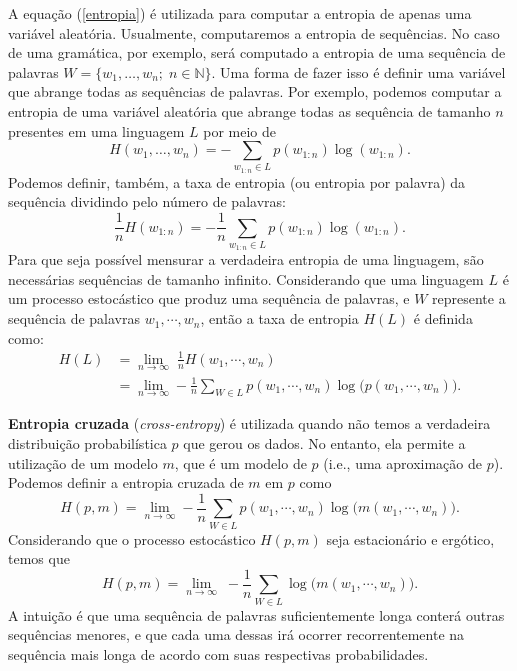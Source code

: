 \documentclass{automatextcc}
\newcommand{\N}{\mathds{N}}
\begin{document}
A equação (\ref{entropia}) é utilizada para computar a entropia de apenas uma variável aleatória. Usualmente, computaremos a entropia de sequências. No caso de uma gramática, por exemplo, será computado a entropia de uma sequência de palavras $W = \{w_1,\dots,w_n; \; n \in \N \}$. Uma forma de fazer isso é definir uma variável que abrange todas as sequências de palavras. Por exemplo, podemos computar a entropia de uma variável aleatória que abrange todas as sequência de tamanho $n$ presentes em uma linguagem $L$ por meio de
\begin{equation*}
    H(w_1,\dots,w_n) = - \sum_{w_{1:n} \in L} p(w_{1:n}) \log(w_{1:n}).
\end{equation*}
Podemos definir, também, a taxa de entropia (ou entropia por palavra) da sequência dividindo pelo número de palavras:
\begin{equation*}
    \frac{1}{n}H(w_{1:n}) = - \frac{1}{n} \sum_{w_{1:n} \in L}  p(w_{1:n}) \log(w_{1:n}).
\end{equation*}
Para que seja possível mensurar a verdadeira entropia de uma linguagem, são necessárias sequências de tamanho infinito. Considerando que uma linguagem $L$ é um processo estocástico que produz uma sequência de palavras, e $W$ represente a sequência de palavras $w_1,\cdots,w_n$, então a taxa de entropia $H(L)$ é definida como:
\begin{align*}
    H(L) & = \lim_{n \rightarrow \infty} \; \frac{1}{n} H(w_1,\cdots,w_n)  \\
         & = \lim_{n \rightarrow \infty} - \frac{1}{n} \sum_{W \in L}  p(w_1,\cdots,w_n)  \log\big(p(w_1,\cdots,w_n)\big).
\end{align*}

\textbf{Entropia cruzada} (\textit{cross-entropy}) é utilizada quando não temos a verdadeira distribuição probabilística $p$ que gerou os dados. No entanto, ela permite a utilização de um modelo $m$, que é um modelo de $p$ (i.e., uma aproximação de $p$). Podemos definir a entropia cruzada de $m$ em $p$ como
\begin{equation*}
    H(p,m) = \lim_{n \rightarrow \infty}  - \frac{1}{n} \sum_{W \in L}  p(w_1,\cdots,w_n) \log\big(m(w_1,\cdots,w_n)\big) .
\end{equation*}
Considerando que o processo estocástico $H(p,m)$ seja estacionário e ergótico, temos que
\begin{equation}
    H(p,m) = \lim_{n \rightarrow \infty} \; - \frac{1}{n} \sum_{W \in L} \log\big(m(w_1,\cdots,w_n)\big).
\end{equation}
A intuição é que uma sequência de palavras suficientemente longa conterá outras sequências menores, e que cada uma dessas irá ocorrer recorrentemente na sequência mais longa de acordo com suas respectivas probabilidades.
\end{document}
